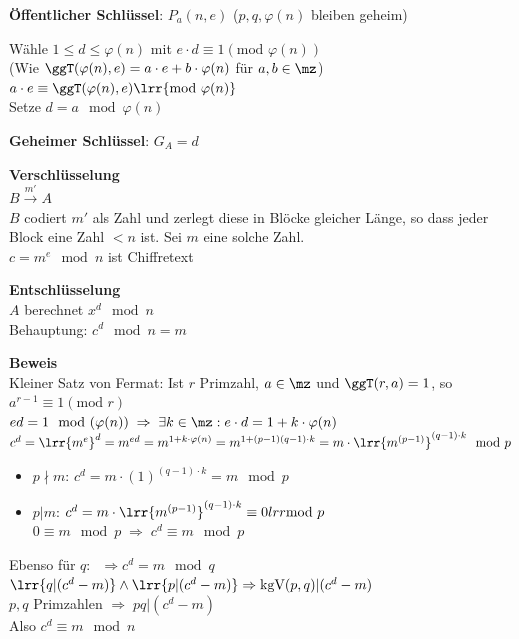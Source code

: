 				\textbf{Öffentlicher Schlüssel}: $P_a(n,e)$ ($p,q,\varphi(n)$ bleiben geheim)
				
				Wähle $1\leq d\leq\varphi(n)$ mit $e\cdot d\equiv 1(\mbox{mod }\varphi(n))$\\
				(Wie $\ggT(\varphi(n),e)=a\cdot e+b\cdot\varphi(n)$ für $a,b\in\mz$)\\
				$a\cdot e\equiv\ggT(\varphi(n),e)\lrr{\mbox{mod }\varphi(n)}$\\
				Setze $d=a\mod\varphi(n)$
				
				\textbf{Geheimer Schlüssel}: $G_A=d$
\newpage
			\item \textbf{Verschlüsselung}\\
				$B\overset{m'}{\longrightarrow} A$	\\
				$B$ codiert $m'$ als Zahl und zerlegt diese in Blöcke gleicher Länge, so dass jeder Block eine Zahl $<n$ ist. Sei $m$ eine solche Zahl.\\
				$c=m^e\mod n$ ist Chiffretext
			\item \textbf{Entschlüsselung}\\
				$A$ berechnet $x^d\mod n$\\
				Behauptung: $c^d\mod n=m$
				
      			\textbf{Beweis}\\
      			Kleiner Satz von Fermat: Ist $r$ Primzahl, $a\in\mz$ und $\ggT(r,a)=1$, so $a^{r-1}\equiv 1(\mbox{mod } r)$\\
				$ed=1\mod(\varphi(n))\;\Rightarrow\;\exists k\in\mz:e\cdot d=1+k\cdot\varphi(n)$\\
				$c^d=\lrr{m^e}^d=m^{ed}=m^{1+k\cdot\varphi(n)}=m^{1+(p-1)(q-1)\cdot k}=m\cdot\lrr{m^{(p-1)}}^{(q-1)\cdot k}\mod p$
				
				\begin{itemize}
					\item $p\nmid m$: $c^d=m\cdot (1)^{(q-1)\cdot k}=m\mod p$
					\item $p|m$: $c^d=m\cdot\lrr{m^{(p-1)}}^{(q-1)\cdot k}\equiv 0\\lrr{\mbox{mod } p}$\\
						$0\equiv m\mod p \;\Rightarrow\; c^d\equiv m\mod p$
				\end{itemize}
				
				Ebenso für $q:\;\;\Rightarrow c^d=m\mod q$\\
				$\lrr{q|(c^d-m)}\land\lrr{p|(c^d-m)}\Rightarrow\mbox{kgV}(p,q)|(c^d-m)$\\
				$p,q$ Primzahlen $\Rightarrow\;pq|(c^d-m)$\\
				Also $c^d\equiv m\mod n$
		\subExEnd

